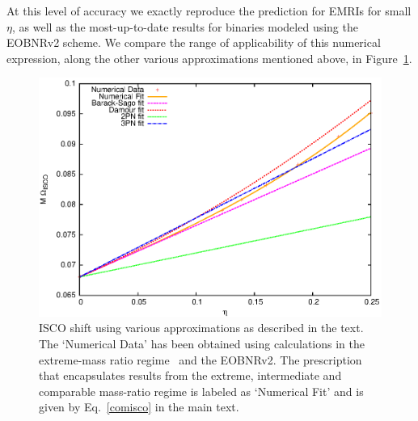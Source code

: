 \noindent At this level of accuracy we exactly reproduce the prediction for EMRIs for small \(\eta\), as well as the most-up-to-date results for binaries modeled using the EOBNRv2 scheme. We compare the range of applicability of this numerical expression, along the other various approximations mentioned above,  in Figure~\ref{iscoshift}.

 
\begin{figure}%
\centerline{
\includegraphics[height=0.8\textwidth,  clip]{figures/insimri/mwiscotwo}
}
\caption{ISCO shift using various approximations as described in the text. The `Numerical Data' has been obtained using calculations in the extreme-mass ratio regime~\cite{inner} and the EOBNRv2. The prescription that encapsulates results from the extreme, intermediate and comparable mass-ratio regime is labeled as `Numerical Fit' and is given by Eq.~\eqref{comisco} in the main text.  }
\label{iscoshift}
\end{figure}


